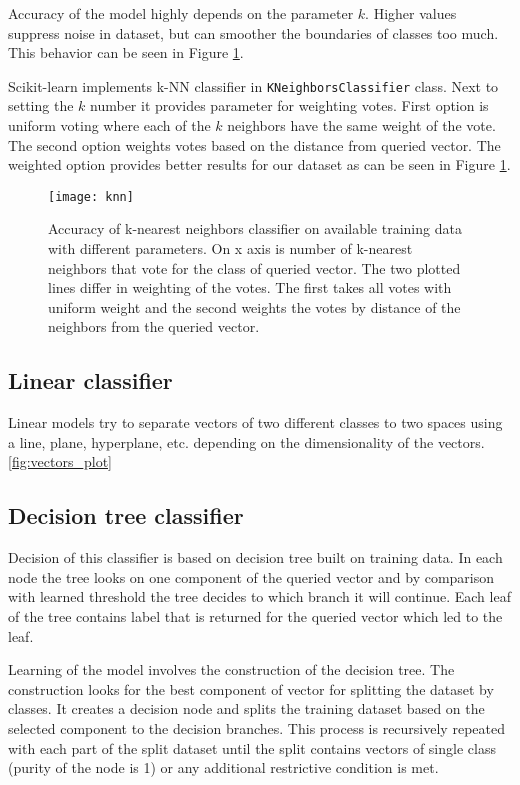 Accuracy of the model highly depends on the parameter $k$. Higher values
suppress noise in dataset, but can smoother the boundaries of classes too much.
This behavior can be seen in Figure \ref{fig:knn}.

Scikit-learn implements k-NN classifier in \texttt{KNeighborsClassifier} class.
Next to setting the $k$ number it provides parameter for weighting votes. First
option is uniform voting where each of the $k$ neighbors have the same weight of
the vote. The second option weights votes based on the distance from queried
vector. The weighted option provides better results for our dataset as can be
seen in Figure \ref{fig:knn}.

\begin{figure}
  \centering
  \texttt{[image: knn]}
  \caption{Accuracy of k-nearest neighbors classifier on available training
    data with different parameters. On x axis is number of k-nearest neighbors
    that vote for the class of queried vector. The two plotted lines differ in
    weighting of the votes. The first takes all votes with uniform weight and
    the second weights the votes by distance of the neighbors from the queried
    vector.}
  \label{fig:knn}
\end{figure}

\subsection{Linear classifier}
Linear models try to separate vectors of two different classes to two spaces
using a line, plane, hyperplane, etc. depending on the dimensionality of the
vectors.
\ref{fig:vectors_plot}

\subsection{Decision tree classifier}
Decision of this classifier is based on decision tree built on training data.
In each node the tree looks on one component of the queried vector and by
comparison with learned threshold the tree decides to which branch it will
continue. Each leaf of the tree contains label that is returned for the queried
vector which led to the leaf.

Learning of the model involves the construction of the decision tree. The
construction looks for the best component of vector for splitting the dataset by
classes. It creates a decision node and splits the training dataset based on the
selected component to the decision branches. This process is recursively
repeated with each part of the split dataset until the split contains vectors of
single class (purity of the node is 1) or any additional restrictive condition
is met.

